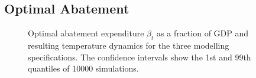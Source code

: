 \documentclass[../../main.tex]{subfiles}
\begin{document}
\subsection{Optimal Abatement}

\begin{figure}[H]
    \centering
    
    \caption{Optimal abatement expenditure $\beta_t$ as a fraction of GDP and resulting temperature dynamics for the three modelling specifications. The confidence intervals show the 1st and 99th quantiles of 10000 simulations.}
    \label{fig:trajectory}
\end{figure}
\end{document}
